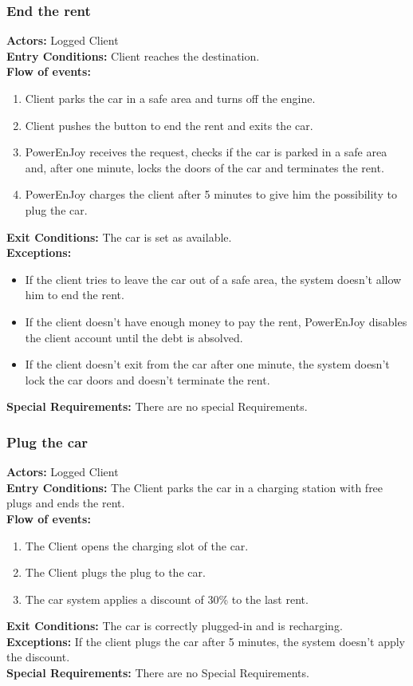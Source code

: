 \subsubsection{End the rent}
%
\textbf{Actors:}
Logged Client \\
%
\textbf{Entry Conditions:}
Client reaches the destination. \\
%
\textbf{Flow of events:}
\begin{enumerate}
\item Client parks the car in a safe area and turns off the engine.
\item Client pushes the button to end the rent and exits the car.
\item PowerEnJoy receives the request, checks if the car is parked in a safe area and, after one minute, locks the doors of the car and terminates the rent.
\item PowerEnJoy charges the client after 5 minutes to give him the possibility to plug the car.
\end{enumerate}
%
\textbf{Exit Conditions:}
The car is set as available. \\
%
\textbf{Exceptions:}
\begin{itemize}
\item If the client tries to leave the car out of a safe area, the system doesn't allow him to end the rent.
\item If the client doesn't have enough money to pay the rent, PowerEnJoy disables the client account until the debt is absolved.
\item If the client doesn't exit from the car after one minute, the system doesn't lock the car doors and doesn't terminate the rent.
\end{itemize}
%
\textbf{Special Requirements:}
There are no special Requirements.



\subsubsection{Plug the car}
%
\textbf{Actors:}
Logged Client \\
%
\textbf{Entry Conditions:}
The Client parks the car in a charging station with free plugs and ends the rent. \\
%
\textbf{Flow of events:}
\begin{enumerate}
\item The Client opens the charging slot of the car.
\item The Client plugs the plug to the car.
\item The car system applies a discount of 30\% to the last rent.
\end{enumerate}
%
\textbf{Exit Conditions:}
The car is correctly plugged-in and is recharging.\\
%
\textbf{Exceptions:}
If the client plugs the car after 5 minutes, the system doesn't apply the discount.\\
%
\textbf{Special Requirements:}
There are no Special Requirements.



